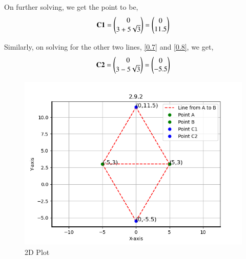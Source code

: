 \documentclass[journal]{IEEEtran}
\begin{document}
On further solving, we get the point to be,
\begin{align}
    \textbf{C1} = \begin{pmatrix}0\\3+5\sqrt{3}\end{pmatrix} = \begin{pmatrix}0\\11.5\end{pmatrix}
    \label{0.11}
\end{align}

Similarly, on solving for the other two lines, \ref{0.7} and \ref{0.8}, we get,
\begin{align}
    \textbf{C2} = \begin{pmatrix}0\\3-5\sqrt{3}\end{pmatrix} = \begin{pmatrix}0\\-5.5\end{pmatrix}
    \label{0.12}
\end{align}

\begin{figure}[H]
    \centering
    \includegraphics[width=0.8\columnwidth]{figs/fig1.png}
    \caption{2D Plot}
    \label{3D Plot}
\end{figure}
\end{document}
